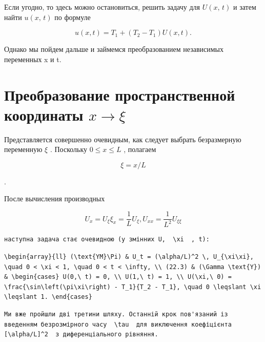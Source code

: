 \documentclass[
  ukrainian,
]{article}
\begin{document}
Если угодно, то здесь можно остановиться, решить задачу для
\(U\left(x,\, t\right)\) и затем найти \(u\left(x,\,t\right)\) по
формуле

\[
u(x, t) = T_1 + (T_2 - T_1) U(x, t).
\]

Однако мы пойдем дальше и займемся преобразованием независимых
переменных x и t.

\section{\texorpdfstring{Преобразование пространственной координаты
\(x \rightarrow \xi\)}{Преобразование пространственной координаты x \textbackslash rightarrow \textbackslash xi}}\label{ux43fux440ux435ux43eux431ux440ux430ux437ux43eux432ux430ux43dux438ux435-ux43fux440ux43eux441ux442ux440ux430ux43dux441ux442ux432ux435ux43dux43dux43eux439-ux43aux43eux43eux440ux434ux438ux43dux430ux442ux44b-x-rightarrow-xi}

Представляется совершенно очевидным, как следует выбрать безразмерную
переменную \(\xi\) . Поскольку \(0 \leqslant x \leqslant L\) , полагаем

\[
\xi = x/L
\]

.

После вычисления производных

\[
U_x = U_{\xi} \xi_x = \frac{1}{L} U_{\xi},
U_{xx} = \frac{1}{L^2} U_{\xi\xi}
\]

\begin{verbatim}
наступна задача стає очевидною (у змінних U,  \xi  , t):
\end{verbatim}

\begin{verbatim}
\begin{array}{ll} (\text{YM}\Pi) & U_t = (\alpha/L)^2 \, U_{\xi\xi}, \quad 0 < \xi < 1, \quad 0 < t < \infty, \\ (22.3) & (\Gamma \text{Y}) & \begin{cases} U(0,\ t) = 0, \\ U(1,\ t) = 1, \\ U(\xi,\ 0) = \frac{\sin\left(\pi\xi\right) - T_1}{T_2 - T_1}, \quad 0 \leqslant \xi \leqslant 1. \end{cases}
\end{verbatim}

\begin{verbatim}
Ми вже пройшли дві третини шляху. Останній крок пов'язаний із введенням безрозмірного часу  \tau  для виключення коефіцієнта  [\alpha/L]^2  з диференціального рівняння.
\end{verbatim}
\end{document}
